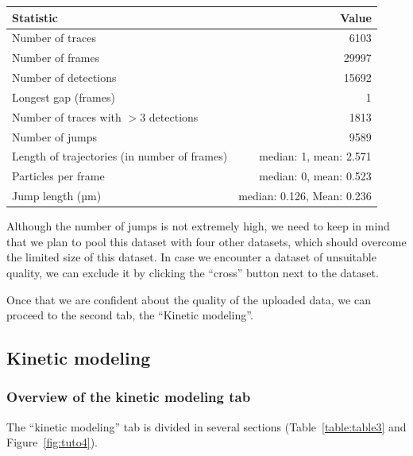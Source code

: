\begin{center}
  \label{table:table2}
  \begin{tabular}{lr}
    Statistic & Value\\
    \hline
    Number of traces & 6103\\
    Number of frames & 29997\\
    Number of detections & 15692\\
    Longest gap (frames) & 1\\
    Number of traces with \(> 3\) detections & 1813\\
    Number of jumps & 9589\\
    Length of trajectories (in number of frames) & median: 1, mean: 2.571\\
    Particles per frame & median: 0, mean: 0.523\\
    Jump length (µm) & median: 0.126, Mean: 0.236\\
  \end{tabular}
\end{center}

Although the number of jumps is not extremely high, we need to keep in mind that we plan to pool this dataset with four other datasets, which should overcome the limited size of this dataset. In case we encounter a dataset of unsuitable quality, we can exclude it by clicking the ``cross'' button next to the dataset.

Once that we are confident about the quality of the uploaded data, we can proceed to the second tab, the ``Kinetic modeling''.

\subsection{Kinetic modeling}
\subsubsection{Overview of the kinetic modeling tab}
The ``kinetic modeling'' tab is divided in several sections (Table~\ref{table:table3} and Figure~\ref{fig:tuto4}).

